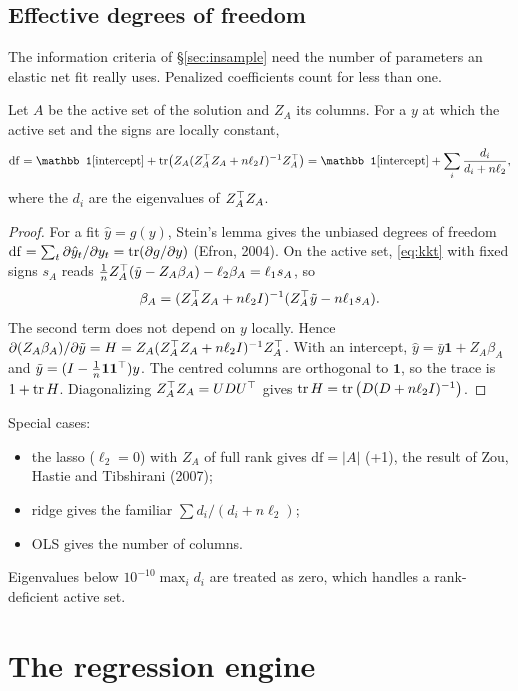 \documentclass[11pt,a4paper]{article}
\begin{document}
\subsection{Effective degrees of freedom}\label{sec:df}

The information criteria of \S\ref{sec:insample} need the number of parameters an elastic net
fit really uses. Penalized coefficients count for less than one.

\begin{proposition}\label{prop:df}
Let $A$ be the active set of the solution and $Z_A$ its columns. For a $y$ at which the
active set and the signs are locally constant,
\[
  \mathrm{df}=\mathbb 1[\text{intercept}]+\tr\!\big(Z_A(Z_A^\T Z_A+n\ell_2I)^{-1}Z_A^\T\big)
  =\mathbb 1[\text{intercept}]+\sum_i\frac{d_i}{d_i+n\ell_2},
\]
where the $d_i$ are the eigenvalues of $Z_A^\top Z_A$.
\end{proposition}
\begin{proof}
For a fit $\hat y=g(y)$, Stein's lemma gives the unbiased degrees of freedom
$\mathrm{df}=\sum_t\partial\hat y_t/\partial y_t=\operatorname{tr}(\partial g/\partial y)$ (Efron, 2004). On the active set, \eqref{eq:kkt} with fixed signs $s_A$ reads
$\frac1nZ_A^\top(\tilde y-Z_A\beta_A)-\ell_2\beta_A=\ell_1s_A$, so
\[
  \beta_A=(Z_A^\top Z_A+n\ell_2I)^{-1}(Z_A^\top\tilde y-n\ell_1s_A).
\]
The second term does not depend on $y$ locally. Hence
$\partial(Z_A\beta_A)/\partial\tilde y=H=Z_A(Z_A^\top Z_A+n\ell_2I)^{-1}Z_A^\top$. With an intercept,
$\hat y=\bar y\mathbf 1+Z_A\beta_A$ and $\tilde y=(I-\frac1n\mathbf 1\mathbf 1^\top)y$. The centred columns are
orthogonal to $\mathbf 1$, so the trace is $1+\operatorname{tr} H$. Diagonalizing $Z_A^\top Z_A=UDU^\top$ gives
$\operatorname{tr} H=\operatorname{tr}\big(D(D+n\ell_2I)^{-1}\big)$.
\end{proof}
Special cases:
\begin{itemize}
  \item the lasso ($\ell_2=0$) with $Z_A$ of full rank gives $\mathrm{df}=|A|$ (+1), the
        result of Zou, Hastie and Tibshirani (2007);
  \item ridge gives the familiar $\sum d_i/(d_i+n\ell_2)$;
  \item OLS gives the number of columns.
\end{itemize}
Eigenvalues below $10^{-10}\max_id_i$ are treated as zero, which handles a rank-deficient
active set.

\section{The regression engine}
\end{document}
